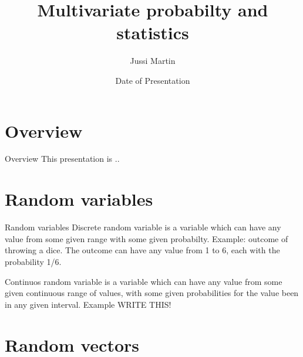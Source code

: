 \documentclass{beamer}
\title[Multivariate probabilty and statistics]{Multivariate probabilty and statistics}
\author{Jussi Martin}
\date{Date of Presentation}
\begin{document}
\begin{frame}
  \titlepage
\end{frame}


%
%
%
%
%

\section{Overview}

\begin{frame}{Overview}
  This presentation is ..
\end{frame}

\section{Random variables}

\begin{frame}{Random variables}
 Discrete random variable is a variable which can have any value from some given
 range with some given probabilty. Example: outcome of throwing a dice. The outcome
 can have any value from 1 to 6, each with the probability 1/6.

 Continuos random variable is a variable which can have any value from some given
 continuous range of values, with some given probabilities for the value been in
 any given interval. Example WRITE THIS!
\end{frame}

\section{Random vectors}
\end{document}
